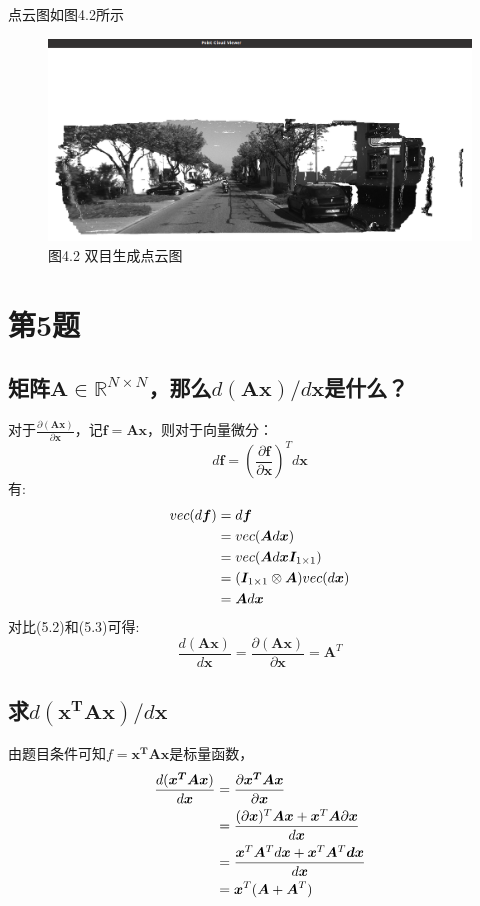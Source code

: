 \documentclass[40pt,a4paper，UTF8]{ctexart}
\numberwithin{equation}{section}
\begin{document}
点云图如图4.2所示
\begin{figure}[H]
\centering
\includegraphics[width=4.8in]{ch4_4_2.png} {图4.2 双目生成点云图}
\end{figure}

\section{第5题}
\subsection{矩阵$\boldsymbol{A}\in \mathbb{R}^{N\times N}$，那么$d(\boldsymbol{Ax})/d\boldsymbol{x}$是什么？}
对于$\frac{\partial{(\bm{Ax})}}{\partial{\bm{x}}}$，记$\bm{f}=\bm{Ax}$，则对于向量微分：
\begin{equation}
d\bm{f}=(\frac{\partial{\bm{f}}}{\partial{\bm{x}}})^Td\bm{x}
\end{equation}
有:
\begin{align}
vec(d\bm{f})
&=d\bm f \notag \\
&=vec(\bm Ad \bm x) \notag \\
&=vec(\bm Ad\bm x \bm I_{1\times 1}) \notag \\
&=(\bm I_{1\times 1} \otimes \bm A)vec(d\bm x) \notag \\
&=\bm A d\bm x
\end{align}
对比(5.2)和(5.3)可得:
\begin{equation}
\frac{d(\boldsymbol{Ax})}{d\boldsymbol{x}}=
\frac{\partial{(\bm{Ax})}}{\partial{\bm{x}}}=\bm A^T
\end{equation}

\subsection{求$d(\bm{x^TAx})/d\bm x$}
由题目条件可知$f=\bm{x^TAx}$是标量函数，
\begin{align}
\frac{d(\boldsymbol{x^TAx})}{d\boldsymbol x}&= 
\frac{\partial{\boldsymbol{x^TAx}}}{\partial{\bm x}} \notag \\
&=
\frac{
(\partial \bm{x})^T\boldsymbol{Ax}+\boldsymbol{x}^T\boldsymbol{A}\partial \bm{x}
}
{d\boldsymbol{x}} \notag \\
&=\frac{\bm x^T \bm A^Td\bm x  + \bm x^T \bm A^T \bm d\bm x}{d\bm x} \notag \\
&=\bm x^T(\bm{A}+\bm{A}^T)
\end{align}
\end{document}
